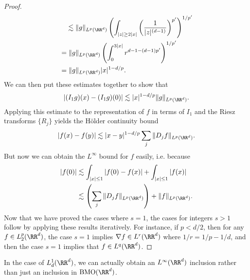 \begin{proof}
\begin{align*}
        &\quad \lesssim \| g \|_{L^p(\RR^d)} \left( \int_{|z| \geq 2 |x|} \left( \frac{1}{|z|^{(d-1)}} \right)^{p'} \right)^{1/p'}\\
        &= \| g \|_{L^p(\RR^d)} \left( \int_0^{3 |x|} r^{d-1 - (d-1)p'} \right)^{1/p'}\\
        &= \| g \|_{L^p(\RR^d)} |x|^{1 - d/p}.
    \end{align*}
    We can then put these estimates together to show that
    \[ |(I_1 g)(x) - (I_1 g)(0)| \lesssim |x|^{1 - d/p} \| g \|_{L^p(\RR^d)}. \]
    Applying this estimate to the representation of $f$ in terms of $I_1$ and the Riesz transforms $\{ R_j \}$ yields the H\"{o}lder continuity bound
    \[ |f(x) - f(y)| \lesssim |x - y|^{1 - d/p} \sum_j \| D_j f \|_{L^p(\RR^d)}.  \]
    But now we can obtain the $L^\infty$ bound for $f$ easily, i.e. because
    \begin{align*}
        |f(0)| &\lesssim \int_{|x| \leq 1} |f(0) - f(x)| + \int_{|x| \leq 1} |f(x)|\\
        &\lesssim \left( \sum_j \| D_j f \|_{L^p(\RR^d)} \right) + \| f \|_{L^p(\RR^d)}.
    \end{align*}
    Now that we have proved the cases where $s = 1$, the cases for integers $s > 1$ follow by applying these results iteratively. For instance, if $p < d/2$, then for any $f \in L^p_2(\RR^d)$, the case $s = 1$ implies $\nabla f \in L^r(\RR^d)$ where $1/r = 1/p - 1/d$, and then the case $s = 1$ implies that $f \in L^q(\RR^d)$.
\end{proof}

In the case of $L^1_d(\RR^d)$, we can actually obtain an $L^\infty(\RR^d)$ inclusion rather than just an inclusion in $\text{BMO}(\RR^d)$.

